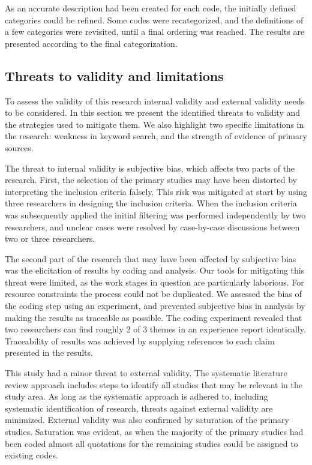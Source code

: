 \documentclass[preprint,authoryear,12pt]{elsarticle}
\begin{document}
As an accurate description had been created for each code, the initially defined
categories could be refined. Some codes were recategorized, and the definitions
of a few categories were revisited, until a final ordering was reached. The
results are presented according to the final categorization.



\subsection{Threats to validity and limitations}

To assess the validity of this research internal validity and external validity
needs to be considered. In this section we present the identified threats to
validity and the strategies used to mitigate them. We also highlight two
specific limitations in the research: weakness in keyword search, and the
strength of evidence of primary sources.

The threat to internal validity is subjective bias, which affects two parts of
the research. First, the selection of the primary studies may have been
distorted by interpreting the inclusion criteria falsely. This risk was
mitigated at start by using three researchers in designing the inclusion
criteria. When the inclusion criteria was subsequently applied the initial
filtering was performed independently by two researchers, and unclear cases were
resolved by case-by-case discussions between two or three researchers.

The second part of the research that may have been affected by subjective bias
was the elicitation of results by coding and analysis. Our tools for mitigating
this threat were limited, as the work stages in question are particularly
laborious. For resource constraints the process could not be duplicated. We
assessed the bias of the coding step using an experiment, and prevented
subjective bias in analysis by making the results as traceable as possible. The
coding experiment revealed that two researchers can find roughly 2 of 3 themes
in an experience report identically. Traceability of results was achieved by
supplying references to each claim presented in the results.

This study had a minor threat to external validity. The systematic literature
review approach includes steps to identify all studies that may be relevant in
the study area. As long as the systematic approach is adhered to, including
systematic identification of research, threats against external validity are
minimized. External validity was also confirmed by saturation of the primary
studies. Saturation was evident, as when the majority of the primary studies had
been coded almost all quotations for the remaining studies could be assigned to
existing codes.
\end{document}
